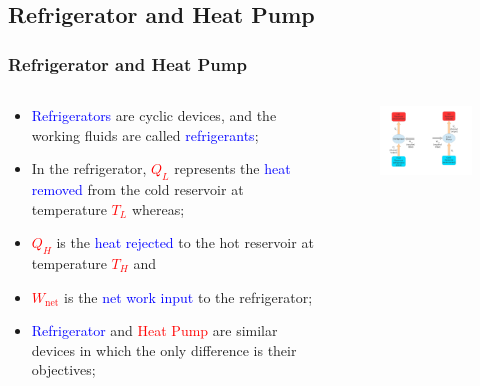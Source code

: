 \documentclass[10pt,compress]{beamer}
\begin{document}
\subsection{Refrigerator and Heat Pump}
\begin{frame}
 \frametitle{Refrigerator and Heat Pump}
  \begin{columns}
   \begin{column}[c]{0.45\linewidth}
    \begin{itemize}
     \item <1-> \textcolor{blue}{Refrigerators} are cyclic devices, and the working fluids are called \textcolor{blue}{refrigerants};
     \item <2-> In the refrigerator, \textcolor{red}{$Q_{L}$} represents the \textcolor{blue}{heat removed} from the cold reservoir at temperature \textcolor{red}{$T_{L}$} whereas;
     \item <3-> \textcolor{red}{$Q_{H}$} is the \textcolor{blue}{heat rejected} to the hot reservoir at temperature \textcolor{red}{$T_{H}$} and 
     \item <4-> \textcolor{red}{$W_{\text{net}}$} is the \textcolor{blue}{net work input} to the refrigerator;
     \item <5-> \textcolor{blue}{Refrigerator} and \textcolor{red}{Heat Pump} are similar devices in which the only difference is their objectives;
    \end{itemize}
   \end{column}
   \begin{column}[c]{0.55\linewidth}
    \begin{figure}%
     \begin{center}
      \includegraphics[width=7.5cm,clip]{./Pics/Overview_Refrig2}
     \end{center}
    \end{figure}
   \end{column}  
  \end{columns}
\end{frame}
\end{document}
